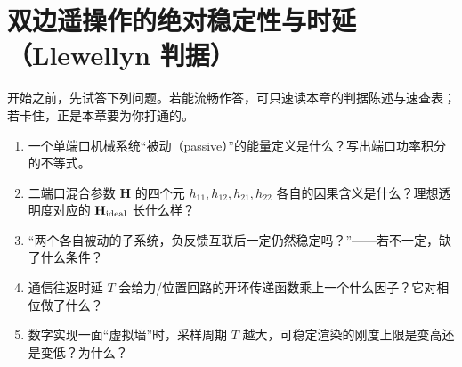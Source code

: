 \chapter{双边遥操作的绝对稳定性与时延（Llewellyn 判据）}\label{ch:teleop-stability}


\begin{practice}[前置自测]
开始之前，先试答下列问题。若能流畅作答，可只速读本章的判据陈述与速查表；若卡住，正是本章要为你打通的。
\begin{enumerate}
  \item 一个单端口机械系统“被动（passive）”的能量定义是什么？写出端口功率积分的不等式。
  \item 二端口混合参数 $\mathbf H$ 的四个元 $h_{11},h_{12},h_{21},h_{22}$ 各自的因果含义是什么？理想透明度对应的 $\mathbf H_{\rm ideal}$ 长什么样？
  \item “两个各自被动的子系统，负反馈互联后一定仍然稳定吗？”——若不一定，缺了什么条件？
  \item 通信往返时延 $T$ 会给力/位置回路的开环传递函数乘上一个什么因子？它对相位做了什么？
  \item 数字实现一面“虚拟墙”时，采样周期 $T$ 越大，可稳定渲染的刚度上限是变高还是变低？为什么？
\end{enumerate}
\end{practice}

